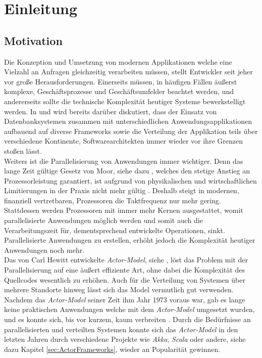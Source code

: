 \chapter{Einleitung}\label{cha:introduction}
\section{Motivation}\label{sec:introduction:motivation}
Die Konzeption und Umsetzung von modernen Applikationen welche eine Vielzahl an Anfragen gleichzeitig verarbeiten müssen, stellt Entwickler seit jeher vor große Herausforderungen. Einerseits müssen, in häufigen Fällen äußerst komplexe, Geschäftsprozesse und Geschäftsumfelder beachtet werden, und andererseits sollte die technische Komplexität heutiger Systeme bewerkstelligt werden. In \cite{Vernon2015ReactiveAkka} und \cite{Evans2004Domain-drivenSoftware} wird bereits darüber diskutiert, dass der Einsatz von Datenbanksystemen zusammen mit unterschiedlichen Anwendungsapplikationen aufbauend auf diverse Frameworks  sowie die Verteilung der Applikation teils über verschiedene Kontinente,  Softwarearchitekten immer wieder vor ihre Grenzen stoßen lässt. \\
Weiters ist die Parallelisierung von Anwendungen immer wichtiger. Denn das lange Zeit gültige Gesetz von Moor, siehe dazu \cite{moore1965moore}, welches den stetige Anstieg an Prozessorleistung garantiert, ist aufgrund von physikalischen und wirtschaftlichen Limitierungen in der Praxis nicht mehr gültig \citep{mann2000end}. Deshalb steigt in modernen, finanziell vertretbaren, Prozessoren die Taktfrequenz nur mehr gering. Stattdessen werden Prozessoren mit immer mehr Kernen ausgestattet, womit parallelisierte Anwendungen möglich werden und somit auch die Verarbeitungszeit für, dementsprechend entwickelte Operationen, sinkt. Parallelisierte Anwendungen zu erstellen, erhöht jedoch die Komplexität heutiger Anwendungen noch mehr. \\
Das von Carl Hewitt entwickelte \textit{Actor-Model}, siehe \cite{Hewitt1973AIntelligence}, löst das Problem mit der Parallelisierung auf eine äußert effiziente Art, ohne dabei die Komplexität des Quellcodes wesentlich zu erhöhen. Auch für die Verteilung von Systemen über mehrere Standorte hinweg lässt sich das Model vermutlich gut verwenden. \\
Nachdem das \textit{Actor-Model} seiner Zeit ihm Jahr 1973 voraus war, gab es lange keine praktischen Anwendungen welche mit dem \textit{Actor-Model} umgesetzt wurden, und es konnte sich, bis vor kurzem, kaum verbreiten \citep{mackay1997has}. Durch die Bedürfnisse an parallelisierten und verteilten Systemen konnte sich das \textit{Actor-Model} in den letzten Jahren durch verschiedene Projekte wie \textit{Akka}, \textit{Scala} oder andere, siehe dazu Kapitel \ref{sec:ActorFrameworks}, wieder an Popularität gewinnen. 

